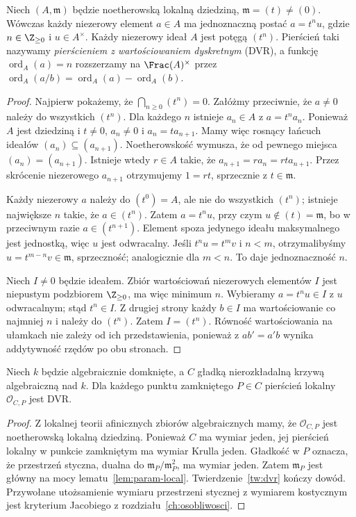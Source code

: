 \begin{twierdzenie}
\label{tw:dvr}
Niech $(A,\mathfrak m)$ będzie noetherowską lokalną
dziedziną, $\mathfrak m=(t)\ne(0)$.
Wówczas każdy niezerowy element $a\in A$ ma
jednoznaczną postać $a=t^n u$, gdzie $n\in\Z_{\ge0}$
i $u\in A^\times$. Każdy niezerowy ideał $A$
jest potęgą $(t^n)$. Pierścień taki nazywamy
\emph{pierścieniem z wartościowaniem dyskretnym}
(DVR), a funkcję $\operatorname{ord}_A(a)=n$
rozszerzamy na $\Frac(A)^\times$ przez
$\operatorname{ord}_A(a/b)=\operatorname{ord}_A(a)-
\operatorname{ord}_A(b)$.
\end{twierdzenie}
\begin{proof}
Najpierw pokażemy, że $\bigcap_{n\ge0}(t^n)=0$.
Załóżmy przeciwnie, że $a\ne0$ należy do wszystkich
$(t^n)$. Dla każdego $n$ istnieje $a_n\in A$ z
$a=t^na_n$. Ponieważ $A$ jest dziedziną i $t\ne0$,
$a_n\ne0$ i $a_n=t a_{n+1}$. Mamy więc rosnący
łańcuch ideałów $(a_n)\subseteq(a_{n+1})$.
Noetherowskość wymusza, że od pewnego miejsca
$(a_n)=(a_{n+1})$. Istnieje wtedy $r\in A$
takie, że $a_{n+1}=r a_n=r t a_{n+1}$.
Przez skrócenie niezerowego $a_{n+1}$ otrzymujemy
$1=rt$, sprzecznie z $t\in\mathfrak m$.

Każdy niezerowy $a$ należy do $(t^0)=A$, ale nie
do wszystkich $(t^n)$; istnieje największe $n$
takie, że $a\in(t^n)$. Zatem $a=t^n u$,
przy czym $u\notin(t)=\mathfrak m$, bo w przeciwnym
razie $a\in(t^{n+1})$. Element spoza jedynego
ideału maksymalnego jest jednostką, więc $u$ jest
odwracalny. Jeśli $t^nu=t^mv$ i $n<m$, otrzymalibyśmy
$u=t^{m-n}v\in\mathfrak m$, sprzeczność;
analogicznie dla $m<n$. To daje jednoznaczność $n$.

Niech $I\ne0$ będzie ideałem. Zbiór wartościowań
niezerowych elementów $I$ jest niepustym podzbiorem
$\Z_{\ge0}$, ma więc minimum $n$. Wybieramy
$a=t^nu\in I$ z $u$ odwracalnym; stąd $t^n\in I$.
Z drugiej strony każdy $b\in I$ ma wartościowanie
co najmniej $n$ i należy do $(t^n)$. Zatem
$I=(t^n)$. Równość wartościowania na ułamkach
nie zależy od ich przedstawienia, ponieważ z
$ab'=a'b$ wynika addytywność rzędów po obu stronach.
\end{proof}

\begin{wniosek}
\label{wn:krzywa-dvr}
Niech $k$ będzie algebraicznie domknięte, a $C$
gładką nierozkładalną krzywą algebraiczną nad $k$.
Dla każdego punktu zamkniętego $P\in C$ pierścień
lokalny $\mathcal O_{C,P}$ jest DVR.
\end{wniosek}
\begin{proof}
Z lokalnej teorii afinicznych zbiorów algebraicznych
mamy, że $\mathcal O_{C,P}$ jest noetherowską
lokalną dziedziną. Ponieważ $C$ ma wymiar jeden,
jej pierścień lokalny w punkcie zamkniętym ma
wymiar Krulla jeden. Gładkość w $P$ oznacza,
że przestrzeń styczna, dualna do
$\mathfrak m_P/\mathfrak m_P^2$, ma wymiar jeden.
Zatem $\mathfrak m_P$ jest główny na mocy
lematu~\ref{lem:param-local}. Twierdzenie~\ref{tw:dvr}
kończy dowód. Przywołane utożsamienie wymiaru
przestrzeni stycznej z wymiarem kostycznym
jest kryterium Jacobiego z rozdziału~\ref{ch:osobliwosci}.
\end{proof}

